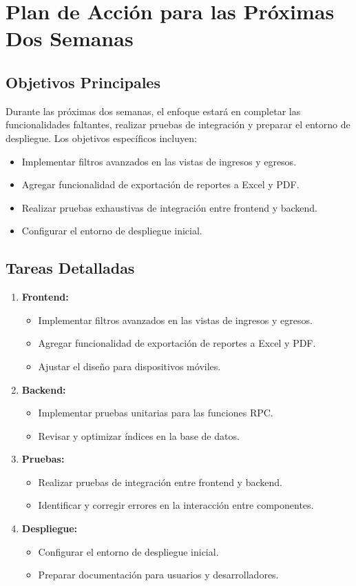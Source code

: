 \section{Plan de Acción para las Próximas Dos Semanas}

\subsection*{Objetivos Principales}
Durante las próximas dos semanas, el enfoque estará en completar las funcionalidades faltantes, realizar pruebas de integración y preparar el entorno de despliegue. Los objetivos específicos incluyen:
\begin{itemize}
    \item Implementar filtros avanzados en las vistas de ingresos y egresos.
    \item Agregar funcionalidad de exportación de reportes a Excel y PDF.
    \item Realizar pruebas exhaustivas de integración entre frontend y backend.
    \item Configurar el entorno de despliegue inicial.
\end{itemize}

\subsection*{Tareas Detalladas}
\begin{enumerate}
    \item \textbf{Frontend:}
    \begin{itemize}
        \item Implementar filtros avanzados en las vistas de ingresos y egresos.
        \item Agregar funcionalidad de exportación de reportes a Excel y PDF.
        \item Ajustar el diseño para dispositivos móviles.
    \end{itemize}
    \item \textbf{Backend:}
    \begin{itemize}
        \item Implementar pruebas unitarias para las funciones RPC.
        \item Revisar y optimizar índices en la base de datos.
    \end{itemize}
    \item \textbf{Pruebas:}
    \begin{itemize}
        \item Realizar pruebas de integración entre frontend y backend.
        \item Identificar y corregir errores en la interacción entre componentes.
    \end{itemize}
    \item \textbf{Despliegue:}
    \begin{itemize}
        \item Configurar el entorno de despliegue inicial.
        \item Preparar documentación para usuarios y desarrolladores.
    \end{itemize}
\end{enumerate}

